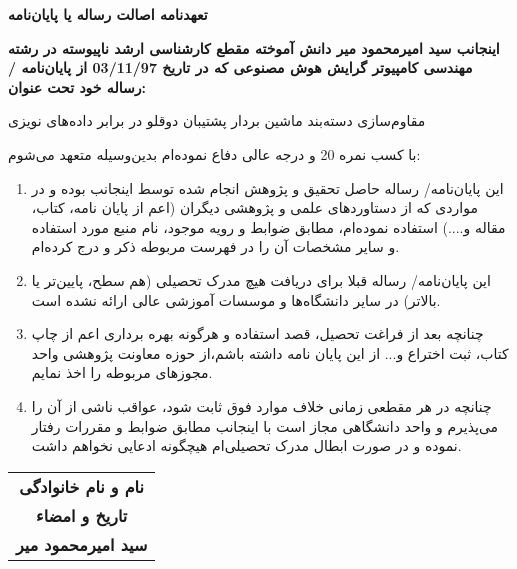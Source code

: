 \thispagestyle{empty}
\noindent

\begin{center}
\textbf{\Large تعهدنامه اصالت رساله یا پایان‌نامه}
\end{center}
\vskip 0.5cm

{\bfseries
اینجانب سید امیرمحمود میر دانش آموخته مقطع کارشناسی ارشد ناپیوسته در رشته مهندسی کامپیوتر گرایش هوش مصنوعی که در تاریخ 03/11/97 از پایان‌نامه / رساله خود تحت عنوان:


\begin{center}
مقاوم‌سازی دسته‌بند ماشین بردار پشتیبان دوقلو در برابر داده‌های نویزی
\end{center}
 
 
با کسب نمره 20 و درجه عالی دفاع نموده‌ام بدین‌وسیله متعهد می‌شوم:
}
\begin{enumerate}
	\item این پایان‌نامه/ رساله حاصل تحقیق و پژوهش انجام شده توسط اینجانب بوده و در مواردی که از دستاوردهای علمی و پژوهشی دیگران (اعم از پایان نامه، کتاب، مقاله و....) استفاده نموده‌ام، مطابق ضوابط و رویه موجود، نام منبع مورد استفاده و سایر مشخصات آن را در فهرست مربوطه ذکر و درج کرده‌ام.
	\item این پایان‌نامه/ رساله قبلا برای دریافت هیچ مدرک تحصیلی (هم سطح، پایین‌تر یا بالاتر) در سایر دانشگاه‌ها و موسسات آموزشی عالی ارائه نشده است.
	\item 	چنانچه بعد از فراغت تحصیل، قصد استفاده و هرگونه بهره برداری اعم از چاپ کتاب، ثبت اختراع و... از این پایان نامه داشته باشم،از حوزه معاونت پژوهشی واحد مجوزهای مربوطه را اخذ نمایم.
	\item 	چنانچه در هر مقطعی زمانی خلاف موارد فوق ثابت شود، عواقب ناشی از آن را می‌پذیرم و واحد دانشگاهی مجاز است با اینجانب مطابق ضوابط و مقررات رفتار نموده و در صورت ابطال مدرک تحصیلی‌ام هیچگونه ادعایی نخواهم داشت.
\end{enumerate}

\vskip 0.5cm
\begin{flushleft}
{\large
\begin{tabular}{@{}c@{}}
\textbf{نام و نام خانوادگی}\\
\textbf{تاریخ و امضاء} \\
\vspace*{-2mm}
\textbf{سید امیرمحمود میر}
\end{tabular}
}
\end{flushleft}